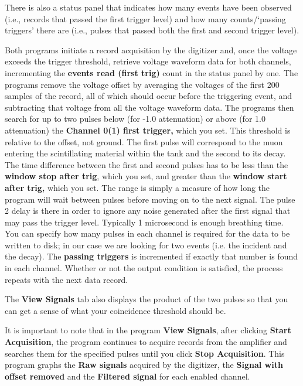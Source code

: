 \documentclass{../lab}
\begin{document}
There is also a status panel that indicates how many events have been observed (i.e., records that passed the first trigger level) and how many counts/`passing triggers' there are (i.e., pulses that passed both the first and second trigger level).

Both programs initiate a record acquisition by the digitizer and, once the voltage exceeds the trigger threshold, retrieve voltage waveform data for both channels, incrementing the \textbf{events read (first trig)} count in the status panel by one. The programs remove the voltage offset by averaging the voltages of the first 200 samples of the record, all of which should occur before the triggering event, and subtracting that voltage from all the voltage waveform data. The programs then search for up to two pulses below (for -1.0 attenuation) or above (for 1.0 attenuation) the \textbf{Channel 0(1) first trigger,} which you set. This threshold is relative to the offset, not ground. The first pulse will correspond to the muon entering the scintillating material within the tank and the second to its decay. The time difference between the first and second pulses has to be less than the \textbf{window stop after trig}, which you set, and greater than the \textbf{window start after trig,} which you set. The range is simply a measure of how long the program will wait between pulses before moving on to the next signal. The pulse 2 delay is there in order to ignore any noise generated after the first signal that may pass the trigger level. Typically 1 microsecond is enough breathing time. You can specify how many pulses in each channel is required for the data to be written to disk; in our case we are looking for two events (i.e. the incident and the decay). The \textbf{passing triggers} is incremented if exactly that number is found in each channel. Whether or not the output condition is satisfied, the process repeats with the next data record.

The \textbf{View Signals} tab also displays the product of the two pulses so that you can get a sense of what your coincidence threshold should be.

It is important to note that in the program \textbf{View Signals}, after clicking \textbf{Start Acquisition}, the program continues to acquire records from the amplifier and searches them for the specified pulses until you click \textbf{Stop Acquisition}. This program graphs the \textbf{Raw signals} acquired by the digitizer, the \textbf{Signal with offset removed} and the \textbf{Filtered signal} for each enabled channel.
\end{document}
